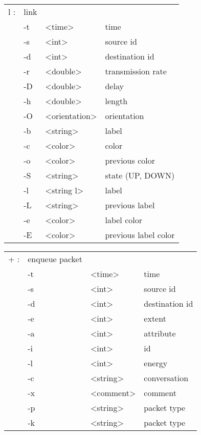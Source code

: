   \begin{tabular}{llll}
  l : & link & & \\
    &  -t & <time> & time \\
    &  -s & <int> & source id \\
    &  -d & <int> & destination id \\
    &  -r & <double> & transmission rate \\
    &  -D & <double> & delay \\
    &  -h & <double> & length \\
    &  -O & <orientation> & orientation \\
    &  -b & <string> & label \\
    &  -c & <color> & color \\
    &  -o & <color> & previous color \\
    &  -S & <string> & state (UP, DOWN) \\
    &  -l & <string l> & label \\
    &  -L & <string> & previous label \\
    &  -e & <color> & label color \\
    &  -E & <color> & previous label color \\
  \end{tabular}

  \begin{tabular}{llll}
  + : & enqueue packet & & \\
    &  -t & <time> & time \\
    &  -s & <int> & source id \\
    &  -d & <int> & destination id \\
    &  -e & <int> & extent \\
    &  -a & <int> & attribute \\
    &  -i & <int> & id \\
    &  -l & <int> & energy \\
    &  -c & <string> & conversation \\
    &  -x & <comment> & comment \\
    &  -p & <string> & packet type \\
    &  -k & <string> & packet type \\
  \end{tabular}

